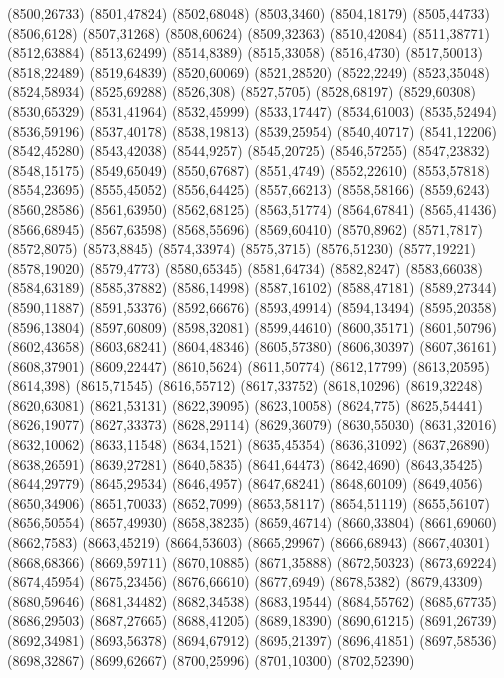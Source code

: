 (8500,26733)
(8501,47824)
(8502,68048)
(8503,3460)
(8504,18179)
(8505,44733)
(8506,6128)
(8507,31268)
(8508,60624)
(8509,32363)
(8510,42084)
(8511,38771)
(8512,63884)
(8513,62499)
(8514,8389)
(8515,33058)
(8516,4730)
(8517,50013)
(8518,22489)
(8519,64839)
(8520,60069)
(8521,28520)
(8522,2249)
(8523,35048)
(8524,58934)
(8525,69288)
(8526,308)
(8527,5705)
(8528,68197)
(8529,60308)
(8530,65329)
(8531,41964)
(8532,45999)
(8533,17447)
(8534,61003)
(8535,52494)
(8536,59196)
(8537,40178)
(8538,19813)
(8539,25954)
(8540,40717)
(8541,12206)
(8542,45280)
(8543,42038)
(8544,9257)
(8545,20725)
(8546,57255)
(8547,23832)
(8548,15175)
(8549,65049)
(8550,67687)
(8551,4749)
(8552,22610)
(8553,57818)
(8554,23695)
(8555,45052)
(8556,64425)
(8557,66213)
(8558,58166)
(8559,6243)
(8560,28586)
(8561,63950)
(8562,68125)
(8563,51774)
(8564,67841)
(8565,41436)
(8566,68945)
(8567,63598)
(8568,55696)
(8569,60410)
(8570,8962)
(8571,7817)
(8572,8075)
(8573,8845)
(8574,33974)
(8575,3715)
(8576,51230)
(8577,19221)
(8578,19020)
(8579,4773)
(8580,65345)
(8581,64734)
(8582,8247)
(8583,66038)
(8584,63189)
(8585,37882)
(8586,14998)
(8587,16102)
(8588,47181)
(8589,27344)
(8590,11887)
(8591,53376)
(8592,66676)
(8593,49914)
(8594,13494)
(8595,20358)
(8596,13804)
(8597,60809)
(8598,32081)
(8599,44610)
(8600,35171)
(8601,50796)
(8602,43658)
(8603,68241)
(8604,48346)
(8605,57380)
(8606,30397)
(8607,36161)
(8608,37901)
(8609,22447)
(8610,5624)
(8611,50774)
(8612,17799)
(8613,20595)
(8614,398)
(8615,71545)
(8616,55712)
(8617,33752)
(8618,10296)
(8619,32248)
(8620,63081)
(8621,53131)
(8622,39095)
(8623,10058)
(8624,775)
(8625,54441)
(8626,19077)
(8627,33373)
(8628,29114)
(8629,36079)
(8630,55030)
(8631,32016)
(8632,10062)
(8633,11548)
(8634,1521)
(8635,45354)
(8636,31092)
(8637,26890)
(8638,26591)
(8639,27281)
(8640,5835)
(8641,64473)
(8642,4690)
(8643,35425)
(8644,29779)
(8645,29534)
(8646,4957)
(8647,68241)
(8648,60109)
(8649,4056)
(8650,34906)
(8651,70033)
(8652,7099)
(8653,58117)
(8654,51119)
(8655,56107)
(8656,50554)
(8657,49930)
(8658,38235)
(8659,46714)
(8660,33804)
(8661,69060)
(8662,7583)
(8663,45219)
(8664,53603)
(8665,29967)
(8666,68943)
(8667,40301)
(8668,68366)
(8669,59711)
(8670,10885)
(8671,35888)
(8672,50323)
(8673,69224)
(8674,45954)
(8675,23456)
(8676,66610)
(8677,6949)
(8678,5382)
(8679,43309)
(8680,59646)
(8681,34482)
(8682,34538)
(8683,19544)
(8684,55762)
(8685,67735)
(8686,29503)
(8687,27665)
(8688,41205)
(8689,18390)
(8690,61215)
(8691,26739)
(8692,34981)
(8693,56378)
(8694,67912)
(8695,21397)
(8696,41851)
(8697,58536)
(8698,32867)
(8699,62667)
(8700,25996)
(8701,10300)
(8702,52390)
